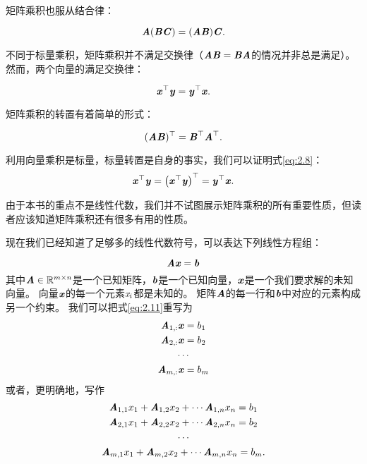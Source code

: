 矩阵乘积也服从结合律：


\begin{equation}
\MA(\MB\MC)=(\MA\MB)\MC.
\end{equation}




不同于标量乘积，矩阵乘积并不满足交换律（$\MA\MB=\MB\MA$的情况并非总是满足）。
然而，两个向量的满足交换律：


\begin{equation}
\label{eq:2.8}
\Vx^\top\Vy=\Vy^\top\Vx.
\end{equation}


矩阵乘积的转置有着简单的形式：


\begin{equation}
(\MA\MB)^\top=\MB^\top\MA^\top.
\end{equation}


利用向量乘积是标量，标量转置是自身的事实，我们可以证明式\ref{eq:2.8}：
\begin{equation}
    \Vx^\top \Vy = \left(\Vx^\top \Vy \right)^\top = \Vy^\top \Vx.
\end{equation}


由于本书的重点不是线性代数，我们并不试图展示矩阵乘积的所有重要性质，但读者应该知道矩阵乘积还有很多有用的性质。


现在我们已经知道了足够多的线性代数符号，可以表达下列线性方程组：


\begin{equation}
\label{eq:2.11}
\MA\Vx=\Vb
\end{equation}
其中$\MA\in \SetR^{m\times n}$是一个已知矩阵，$\Vb$是一个已知向量，$\Vx$是一个我们要求解的未知向量。
向量$\Vx$的每一个元素$\Sx_i$都是未知的。
矩阵$\MA$的每一行和$\Vb$中对应的元素构成另一个约束。
我们可以把式\ref{eq:2.11}重写为
\begin{gather}
\MA_{1,:}\Vx=b_1\\
\MA_{2,:}\Vx=b_2 \\
\cdots \\
\MA_{m,:}\Vx=b_m
\end{gather}
或者，更明确地，写作
\begin{gather}
    \MA_{1,1}x_1+\MA_{1,2}x_2+\cdots \MA_{1,n}x_n = b_1\\
    \MA_{2,1}x_1+\MA_{2,2}x_2+\cdots \MA_{2,n}x_n = b_2\\
    \cdots\\
    \MA_{m,1}x_1+\MA_{m,2}x_2+\cdots \MA_{m,n}x_n = b_m.
\end{gather}


